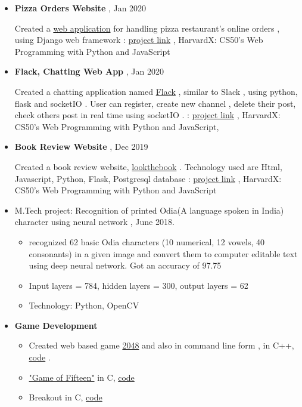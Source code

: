 \documentclass[a4paper,10pt]{article}
\begin{document}
	\begin{itemize}
	\item \textbf{Pizza Orders Website} , Jan 2020
	
	 Created a \href{https://pizzacs50w.herokuapp.com/}{web application} for handling pizza restaurant's online orders , using Django web framework : \href{https://github.com/eelectron/pizza}{project link} , HarvardX: CS50's Web Programming with Python and JavaScript
					
				\item \textbf{Flack, Chatting Web App} , Jan 2020 
				
				Created a chatting application named \href{https://flackthechat.herokuapp.com}{Flack} , similar to Slack , using python, flask and socketIO . User can register, create new channel , delete their post, check others post in real time using socketIO . : \href{https://github.com/eelectron/flack}{project link} , HarvardX: CS50's Web Programming with Python and JavaScript, 
				
				\item \textbf{Book Review Website} , Dec 2019
				
				Created a book review website, \href{http://lookthebook.herokuapp.com}{lookthebook} . Technology used are Html, Javascript, Python, Flask, Postgresql database : \href{https://github.com/eelectron/BookReview}{project link}  , HarvardX: CS50's Web Programming with Python and JavaScript 
				
				
				\item M.Tech project: Recognition of printed Odia(A language spoken in India) character using neural network , June 2018.
				\begin{itemize}
				    \item recognized 62 basic Odia characters (10 numerical, 12 vowels, 40 consonants) in a given image and convert them to computer editable text using deep neural network. Got an accuracy of 97.75
				    \item Input layers = 784, hidden layers = 300, output layers = 62
				    \item Technology: Python, OpenCV
				\end{itemize}
					
                			
				\item \textbf{Game Development} 
				    \begin{itemize}
				    \item 
				    Created web based game \href{https://gitlab.com/psonlinux/2048-game-web}{2048} and also in command line form , in C++, \href{https://gitlab.com/psonlinux/2048}{code} .
				        \item \href{https://en.wikipedia.org/wiki/15_puzzle}{"Game of Fifteen"} in C, \href{https://gitlab.com/psonlinux/game-of-fifteen}{code}
\item Breakout in C, \href{https://gitlab.com/psonlinux/breakout}{code}				    
				    \end{itemize}
			\end{itemize}
			
\end{document}
